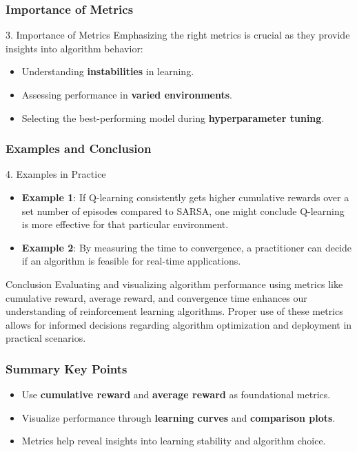 \documentclass[aspectratio=169]{beamer}
\begin{document}
\begin{frame}[fragile]
    \frametitle{Importance of Metrics}
    \begin{block}{3. Importance of Metrics}
        Emphasizing the right metrics is crucial as they provide insights into algorithm behavior:
        \begin{itemize}
            \item Understanding \textbf{instabilities} in learning.
            \item Assessing performance in \textbf{varied environments}.
            \item Selecting the best-performing model during \textbf{hyperparameter tuning}.
        \end{itemize}
    \end{block}
\end{frame}

\begin{frame}[fragile]
    \frametitle{Examples and Conclusion}
    \begin{block}{4. Examples in Practice}
        \begin{itemize}
            \item \textbf{Example 1}:
                If Q-learning consistently gets higher cumulative rewards over a set number of episodes compared to SARSA, one might conclude Q-learning is more effective for that particular environment.

            \item \textbf{Example 2}:
                By measuring the time to convergence, a practitioner can decide if an algorithm is feasible for real-time applications.
        \end{itemize}
    \end{block}
    
    \begin{block}{Conclusion}
        Evaluating and visualizing algorithm performance using metrics like cumulative reward, average reward, and convergence time enhances our understanding of reinforcement learning algorithms. Proper use of these metrics allows for informed decisions regarding algorithm optimization and deployment in practical scenarios.
    \end{block}
\end{frame}

\begin{frame}[fragile]
    \frametitle{Summary Key Points}
    \begin{itemize}
        \item Use \textbf{cumulative reward} and \textbf{average reward} as foundational metrics.
        \item Visualize performance through \textbf{learning curves} and \textbf{comparison plots}.
        \item Metrics help reveal insights into learning stability and algorithm choice.
    \end{itemize}
\end{frame}
\end{document}
